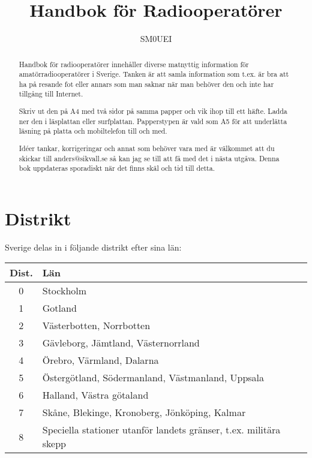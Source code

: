 \documentclass[12pt,swedish,a4paper]{article}
\begin{document}
\title{Handbok för Radiooperatörer}
\author{SM0UEI}
\maketitle

\begin{abstract}
Handbok för radiooperatörer innehåller diverse matnyttig information för amatörradiooperatörer i Sverige. Tanken är att samla information som t.ex. är bra att ha på resande fot eller annars som man saknar när man behöver den och inte har tillgång till Internet.

Skriv ut den på A4 med två sidor på samma papper och vik ihop till ett häfte. Ladda ner den i läsplattan eller surfplattan. Papperstypen är vald som A5 för att underlätta läsning på platta och mobiltelefon till och med.

Idéer tankar, korrigeringar och annat som behöver vara med är välkommet att du skickar till anders@sikvall.se så kan jag se till att få med det i nästa utgåva. Denna bok uppdateras sporadiskt när det finns skäl och tid till detta.
\end{abstract}

\clearpage
\tableofcontents
\clearpage

\setlength{\parskip}{0.5em}
\setlength{\parindent}{0pt}


\section{Distrikt}

Sverige delas in i följande distrikt efter sina län:

\begin{tabular}{cl}
\textbf{Dist.} & \textbf{Län}\\
\hline
0 & Stockholm\\
1 & Gotland\\
2 & Västerbotten, Norrbotten\\
3 & Gävleborg, Jämtland, Västernorrland\\
4 & Örebro, Värmland, Dalarna\\
5 & Östergötland, Södermanland, Västmanland, Uppsala\\
6 & Halland, Västra götaland\\
7 & Skåne, Blekinge, Kronoberg, Jönköping, Kalmar\\
8 & Speciella stationer utanför landets gränser, t.ex. militära skepp\\
\end{tabular}
\end{document}
